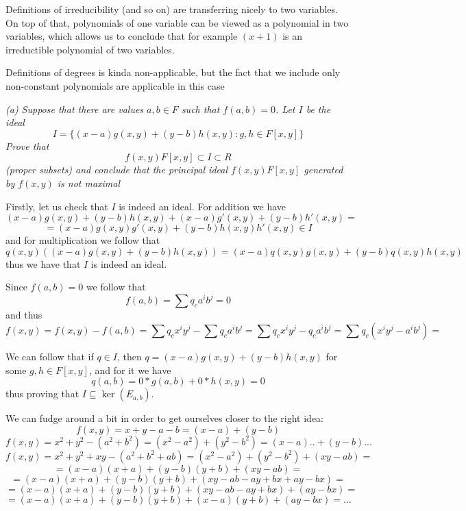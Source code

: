 \documentclass[11pt,oneside,titlepage]{book}
\newcommand{\set}[1]{\{ #1 \}}
\begin{document}
Definitions of irreducibility (and so on) are transferring nicely
to two variables. On top of that, polynomials of one variable can be
viewed as a polynomial in two variables, which allows us to conclude
that for example $(x + 1)$ is an irreductible polynomial of two
variables.

Definitions of degrees is kinda non-applicable, but the fact that we
include only non-constant polynomials are applicable in this case

\textit{(a) Suppose that there are values $a, b \in F$ such that $f(a,
  b) = 0$. Let $I$ be the ideal
  $$I = \set{(x - a) g(x, y) + (y - b) h(x, y): g, h \in F[x, y]}$$
  Prove that
  $$f(x, y)F[x, y] \subset I \subset R$$
  (proper subsets) and conclude that the principal ideal $f(x, y)F[x,
  y]$ generated by $f(x, y)$ is not maximal }


Firstly, let us check that $I$ is indeed an ideal. For addition we have
$$(x - a)g(x, y) + (y - b)h(x, y) + (x - a)g'(x, y) + (y - b)h'(x, y) = $$
$$= (x - a)g(x, y)g'(x, y) + (y - b)h(x, y)h'(x, y) \in I$$
and for multiplication we follow that 
$$q(x, y) ((x - a)g(x, y) + (y - b)h(x, y)) =
(x - a)q(x, y)g(x, y) + (y - b)q(x, y)h(x, y)$$
thus we have that $I$ is indeed an ideal.

Since $f(a, b) = 0$ we follow that
$$f(a, b) = \sum{q_c a^i b^j} = 0$$
and thus
$$f(x, y) = f(x, y) - f(a, b) = \sum{q_c x^i y^j} - \sum{q_c a^i b^j} =
\sum{q_c x^i y^j - q_c a^i b^j} = \sum{q_c (x^i y^j - a^i b^j)} = $$

We can follow that if $q \in I$, then $q = (x - a)g(x, y) + (y - b)h(x, y)$
for some $g, h \in F[x, y]$, and for it we have
$$q(a, b) = 0 * g(a, b) + 0 * h(x, y) = 0$$
thus proving that $I \subseteq \ker(E_{a, b})$.

We can fudge around a bit in order to get ourselves closer
to the right idea:
$$f(x, y) = x + y - a - b = (x - a) + (y - b)$$
$$f(x, y) = x^2 + y^2 - (a^2 + b^2) = (x^2 - a^2) + (y^2 - b^2) = (x - a) .. + (y - b) ...$$
$$f(x, y) = x^2 + y^2 + xy - (a^2 + b^2 + ab) = (x^2 - a^2) + (y^2 - b^2) + (xy - ab) =$$
$$= 
(x - a)(x + a) + (y - b)(y + b) + (xy - ab) = $$
$$ = (x - a)(x + a) + (y -
b)(y + b) + (xy - ab - ay + bx + ay - bx) = $$
$$ = (x - a)(x + a) + (y - b)(y
+ b) + (xy - ab - ay + bx) + (ay - bx) = $$
$$ =
(x - a)(x + a) + (y - b)(y + b) + (x - a) (y + b) + (ay - bx) = ...$$
\end{document}

